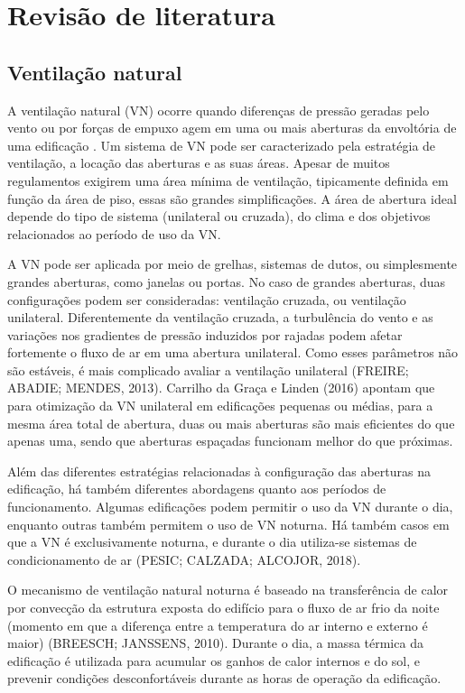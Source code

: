 \documentclass[brazil,hardcopy,openany,a5paper]{ufscthesis}
\begin{document}
\chapter{Revisão de literatura}
	
	\section{Ventilação natural}
	
	A ventilação natural (VN) ocorre quando diferenças de pressão geradas pelo vento ou por forças de empuxo agem em uma ou mais aberturas da envoltória de uma edificação \cite{CarrilhodaGraca2016}. Um sistema de VN pode ser caracterizado pela estratégia de ventilação, a locação das aberturas e as suas áreas. Apesar de muitos regulamentos exigirem uma área mínima de ventilação, tipicamente definida em função da área de piso, essas são grandes simplificações. A área de abertura ideal depende do tipo de sistema (unilateral ou cruzada), do clima e dos objetivos relacionados ao período de uso da VN.
	
	A VN pode ser aplicada por meio de grelhas, sistemas de dutos, ou simplesmente grandes aberturas, como janelas ou portas. No caso de grandes aberturas, duas configurações podem ser consideradas: ventilação cruzada, ou ventilação unilateral. Diferentemente da ventilação cruzada, a turbulência do vento e as variações nos gradientes de pressão induzidos por rajadas podem afetar fortemente o fluxo de ar em uma abertura unilateral. Como esses parâmetros não são estáveis, é mais complicado avaliar a ventilação unilateral (FREIRE; ABADIE; MENDES, 2013). Carrilho da Graça e Linden (2016) apontam que para otimização da VN unilateral em edificações pequenas ou médias, para
	a mesma área total de abertura, duas ou mais aberturas são mais eficientes do que apenas uma, sendo que aberturas espaçadas funcionam melhor do que próximas.
	
	Além das diferentes estratégias relacionadas à configuração das aberturas na edificação, há também diferentes abordagens quanto aos períodos de funcionamento. Algumas edificações podem permitir o uso da VN durante o dia, enquanto outras também permitem o uso de VN noturna. Há também casos em que a VN é exclusivamente noturna, e durante o dia utiliza-se sistemas de condicionamento de ar (PESIC; CALZADA; ALCOJOR, 2018).
	
	O mecanismo de ventilação natural noturna é baseado na transferência de calor por convecção da estrutura exposta do edifício para o fluxo de ar frio da noite (momento em que a diferença entre a temperatura do ar interno e externo é maior) (BREESCH; JANSSENS, 2010). Durante o dia, a massa térmica da	edificação é utilizada para acumular os ganhos de calor internos e do sol, e prevenir condições desconfortáveis durante as horas de operação da edificação.
	
\end{document}
